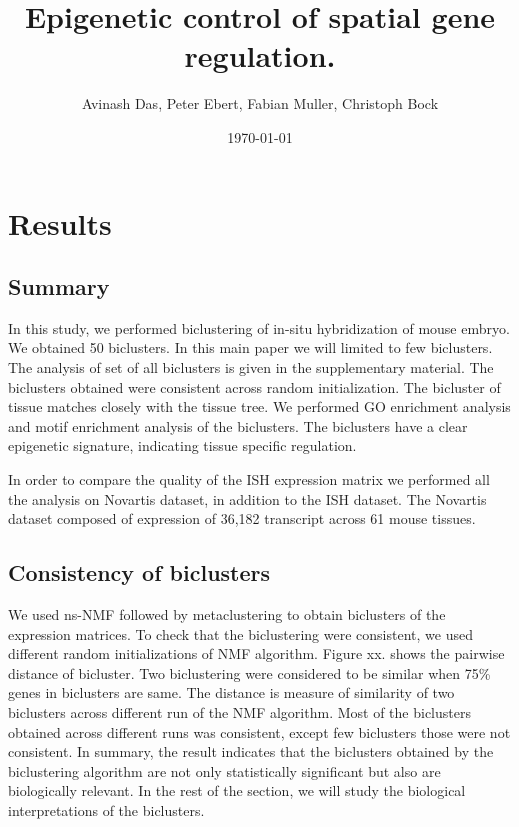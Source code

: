 \documentclass{article}
\title{
Epigenetic control of spatial gene regulation. 
}
\author{Avinash Das, Peter Ebert, Fabian Muller, Christoph Bock}
\date{\today}
\begin{document}
\pagestyle{fancy}

\maketitle

\section{Results}
\subsection{Summary}
In this study, we performed biclustering of in-situ hybridization of mouse embryo. We obtained 50 biclusters. 
In this main paper we will limited to few biclusters. The analysis of set of all biclusters is given in the supplementary material. 
The biclusters obtained were consistent across random initialization.
The bicluster of tissue matches closely with the tissue tree. We performed GO enrichment analysis and motif enrichment analysis of the biclusters. The
biclusters have a clear epigenetic signature, indicating tissue specific regulation. 

In order to compare the quality of the ISH expression matrix we performed all the analysis on Novartis dataset, in addition to the ISH dataset. The Novartis
dataset composed of expression of 36,182 transcript across 61 mouse tissues. 

\subsection{Consistency of biclusters}
We used ns-NMF followed by metaclustering to obtain biclusters of the expression matrices. 
To check that the biclustering were consistent,  we used different random initializations of NMF algorithm. Figure xx. shows the pairwise distance of 
bicluster. Two biclustering were considered to be similar when 75\% genes in biclusters are same. The distance is measure of similarity of two biclusters across different run of 
the NMF algorithm. Most of the biclusters obtained across different runs was consistent, except few biclusters those were not consistent. 
In summary, the result indicates that the biclusters obtained by the biclustering
algorithm are not only statistically significant but also are biologically relevant. In the rest of the section, we will study the biological 
interpretations of the biclusters. 
\end{document}
